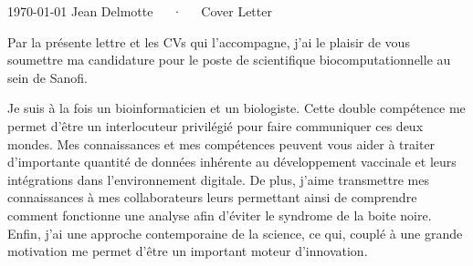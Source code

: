\documentclass[11pt, a4paper]{awesome-cv}
\begin{document}
\makecvheader[L]

\makecvfooter
  {\today}
  {Jean Delmotte~~~·~~~Cover Letter}
  {\thepage}
\makelettertitle

\begin{cvletter}

Par la présente lettre et les CVs qui l’accompagne, j’ai le plaisir de vous soumettre ma candidature pour le poste de scientifique biocomputationnelle au sein de Sanofi.


Je suis à la fois un bioinformaticien et un biologiste. Cette double compétence me permet d'être un interlocuteur privilégié pour faire communiquer ces deux mondes. Mes connaissances et mes compétences peuvent vous aider à 
traiter d'importante quantité de données inhérente au développement vaccinale et leurs intégrations dans l'environnement digitale. De plus, j'aime transmettre mes connaissances à mes collaborateurs leurs permettant ainsi de comprendre comment fonctionne une analyse afin d'éviter le syndrome de la boite noire. Enfin, j'ai une approche contemporaine de la science, ce qui, couplé à une grande motivation me permet d’être un important moteur d’innovation.




\end{cvletter}
\end{document}
